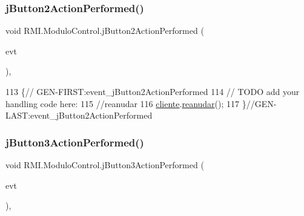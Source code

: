 \subsubsection{\texorpdfstring{j\+Button2\+Action\+Performed()}{jButton2ActionPerformed()}}
{\footnotesize\ttfamily void R\+M\+I.\+Modulo\+Control.\+j\+Button2\+Action\+Performed (\begin{DoxyParamCaption}\item[{java.\+awt.\+event.\+Action\+Event}]{evt }\end{DoxyParamCaption})\hspace{0.3cm}{\ttfamily [inline]}, {\ttfamily [private]}}


\begin{DoxyCode}
113                                                                          \{\textcolor{comment}{//
      GEN-FIRST:event\_jButton2ActionPerformed}
114         \textcolor{comment}{// TODO add your handling code here:}
115         \textcolor{comment}{//reanudar}
116         \mbox{\hyperlink{class_r_m_i_1_1_modulo_control_affa108de8511c1fdd849d2d6a6304d4e}{cliente}}.\mbox{\hyperlink{class_r_m_i_1_1_cliente_ae9504706637d8e4abfe5e11760fa9ce9}{reanudar}}();
117     \}\textcolor{comment}{//GEN-LAST:event\_jButton2ActionPerformed}
\end{DoxyCode}
\mbox{\label{class_r_m_i_1_1_modulo_control_a1fa4d225beca82a6bdff229861d48ff1}} 
\subsubsection{\texorpdfstring{j\+Button3\+Action\+Performed()}{jButton3ActionPerformed()}}
{\footnotesize\ttfamily void R\+M\+I.\+Modulo\+Control.\+j\+Button3\+Action\+Performed (\begin{DoxyParamCaption}\item[{java.\+awt.\+event.\+Action\+Event}]{evt }\end{DoxyParamCaption})\hspace{0.3cm}{\ttfamily [inline]}, {\ttfamily [private]}}


